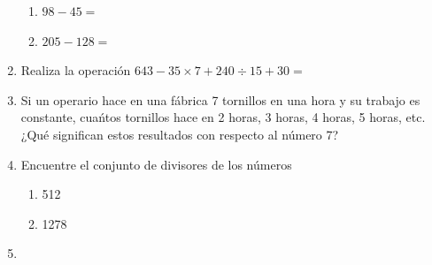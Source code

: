 \documentclass[fleqn]{article}
\begin{document}
\begin{enumerate}
\begin{enumerate}
 \item $98-45=$\noanswer
 \item $205-128=$\noanswer
\end{enumerate}
\item Realiza la operación $643-35\times 7+240\div15+30=$\noanswer
\item Si un operario hace en una fábrica 7 tornillos en una hora y su trabajo es constante, cuańtos tornillos hace en 2 horas, 3 horas, 4 horas, 5 horas, etc. ¿Qué significan estos resultados con respecto al número 7?\noanswer
\item Encuentre el conjunto de divisores de los números
\begin{enumerate}
 \item 512 \noanswer
 \item 1278 \noanswer
\end{enumerate}
\item 
\end{enumerate}
\end{document}
